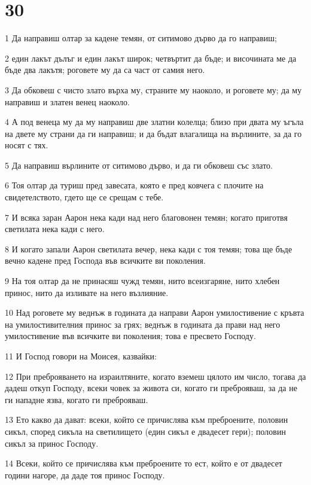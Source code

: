 \chapter{30}

\par 1 Да направиш олтар за кадене темян, от ситимово дърво да го направиш;
\par 2 един лакът дълъг и един лакът широк; четвъртит да бъде; и височината ме да бъде два лакътя; роговете му да са част от самия него.
\par 3 Да обковеш с чисто злато върха му, страните му наоколо, и роговете му; да му направиш и златен венец наоколо.
\par 4 А под венеца му да му направиш две златни колелца; близо при двата му ъгъла на двете му страни да ги направиш; и да бъдат влагалища на върлините, за да го носят с тях.
\par 5 Да направиш върлините от ситимово дърво, и да ги обковеш със злато.
\par 6 Тоя олтар да туриш пред завесата, която е пред ковчега с плочите на свидетелството, гдето ще се срещам с тебе.
\par 7 И всяка заран Аарон нека кади над него благовонен темян; когато приготвя светилата нека кади с него.
\par 8 И когато запали Аарон светилата вечер, нека кади с тоя темян; това ще бъде вечно кадене пред Господа във всичките ви поколения.
\par 9 На тоя олтар да не принасяш чужд темян, нито всеизгаряне, нито хлебен принос, нито да изливате на него възлияние.
\par 10 Над роговете му веднъж в годината да направи Аарон умилостивение с кръвта на умилостивителния принос за грях; веднъж в годината да прави над него умилостивение във всичките ви поколения; това е пресвето Господу.
\par 11 И Господ говори на Моисея, казвайки:
\par 12 При преброяването на израилтяните, когато вземеш цялото им число, тогава да дадеш откуп Господу, всеки човек за живота си, когато ги преброяваш, за да не ги нападне язва, когато ги преброяваш.
\par 13 Ето какво да дават: всеки, който се причислява към преброените, половин сикъл, според сикъла на светилището (един сикъл е двадесет гери); половин сикъл за принос Господу.
\par 14 Всеки, който се причислява към преброените то ест, който е от двадесет години нагоре, да даде тоя принос Господу.
